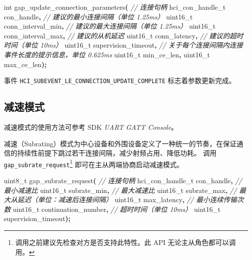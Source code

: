 \documentclass[
  12pt,
]{book}
\newenvironment{Shaded}{\begin{snugshade}}{\end{snugshade}}
\newcommand{\CommentTok}[1]{\textcolor[rgb]{0.56,0.35,0.01}{\textit{#1}}}
\newcommand{\DataTypeTok}[1]{\textcolor[rgb]{0.13,0.29,0.53}{#1}}
\newcommand{\NormalTok}[1]{#1}
\newcommand{\OperatorTok}[1]{\textcolor[rgb]{0.81,0.36,0.00}{\textbf{#1}}}
\begin{document}
\begin{Shaded}
\begin{Highlighting}[]
\DataTypeTok{int}\NormalTok{ gap\_update\_connection\_parameters}\OperatorTok{(}
  \CommentTok{// 连接句柄}
\NormalTok{  hci\_con\_handle\_t con\_handle}\OperatorTok{,}
  \CommentTok{// 建议的最小连接间隔（单位 1.25ms）}
  \DataTypeTok{uint16\_t}\NormalTok{ conn\_interval\_min}\OperatorTok{,}
  \CommentTok{// 建议的最大连接间隔（单位 1.25ms）}
  \DataTypeTok{uint16\_t}\NormalTok{ conn\_interval\_max}\OperatorTok{,}
  \CommentTok{// 建议的从机延迟}
  \DataTypeTok{uint16\_t}\NormalTok{ conn\_latency}\OperatorTok{,}
  \CommentTok{// 建议的超时时间（单位 10ms）}
  \DataTypeTok{uint16\_t}\NormalTok{ supervision\_timeout}\OperatorTok{,}
  \CommentTok{// 关于每个连接间隔内连接事件长度的提示信息，单位 0.625ms}
  \DataTypeTok{uint16\_t}\NormalTok{ min\_ce\_len}\OperatorTok{,}
  \DataTypeTok{uint16\_t}\NormalTok{ max\_ce\_len}\OperatorTok{);}
\end{Highlighting}
\end{Shaded}

事件 \texttt{HCI\_SUBEVENT\_LE\_CONNECTION\_UPDATE\_COMPLETE} 标志着参数更新完成。

\hypertarget{ch-conn-subrating}{%
\subsection{减速模式}\label{ch-conn-subrating}}

减速模式的使用方法可参考 SDK \emph{UART GATT Console}。

减速（Subrating）模式为中心设备和外围设备定义了一种统一的节奏，在保证通信的持续性前提下跳过若干连接间隔，减少射频占用、降低功耗。
调用 \texttt{gap\_subrate\_request}\footnote{调用之前建议先检查对方是否支持此特性。此 API 无论主从角色都可以调用。} 即可在主从两端协商启动减速模式。

\begin{Shaded}
\begin{Highlighting}[]
\DataTypeTok{uint8\_t}\NormalTok{ gap\_subrate\_request}\OperatorTok{(}
  \CommentTok{// 连接句柄}
\NormalTok{  hci\_con\_handle\_t con\_handle}\OperatorTok{,}
  \CommentTok{// 最小减速比}
  \DataTypeTok{uint16\_t}\NormalTok{ subrate\_min}\OperatorTok{,}
  \CommentTok{// 最大减速比}
  \DataTypeTok{uint16\_t}\NormalTok{ subrate\_max}\OperatorTok{,}
  \CommentTok{// 最大从延迟（单位：减速后连接间隔）}
  \DataTypeTok{uint16\_t}\NormalTok{ max\_latency}\OperatorTok{,}
  \CommentTok{// 最小连续传输次数}
  \DataTypeTok{uint16\_t}\NormalTok{ continuation\_number}\OperatorTok{,}
  \CommentTok{// 超时时间（单位 10ms）}
  \DataTypeTok{uint16\_t}\NormalTok{ supervision\_timeout}\OperatorTok{);}
\end{Highlighting}
\end{Shaded}
\end{document}
